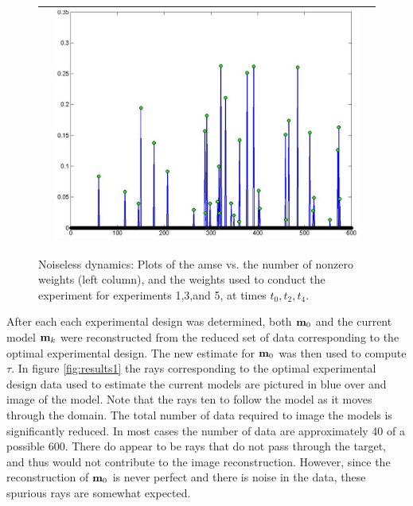 \documentclass[11pt]{article}
\newcommand{\bfm}	{{\bf{m}}}
\begin{document}
{\begin{figure}[!h]
\begin{center}
\begin{tabular}{|c|c|c|}
			&
			\includegraphics[width=.8\iwidth]{figures/newFigs/exp5Weights}\\			
			\hline
		\end{tabular}
	\end{center}
	\caption{Noiseless dynamics: Plots of the {\sf amse} vs. the number of nonzero weights (left column), and the weights used to conduct the experiment for experiments 1,3,and 5, at times $t_0,t_2,t_4$.}
	\label{fig:weights1}
\end{figure}

After each each experimental design was determined, both $\bfm_0$ and the current model $\bfm_k$ were reconstructed from the reduced set of data corresponding to the optimal experimental design. The new estimate for $\bfm_0$ was then used to compute $\tau$. In figure \ref{fig:results1} the rays corresponding to the optimal experimental design data used to estimate the current models are pictured in blue over and image of the model. Note that the rays ten to follow the model as it moves through the domain. The total number of data required to image the models is significantly reduced. In most cases the number of data are approximately 40 of a possible 600. There do appear to be rays that do not pass through the target, and thus would not contribute to the image reconstruction. However, since the reconstruction of $\bfm_0$ is never perfect and there is noise in the data, these spurious rays are somewhat expected. 

}
\end{document}

